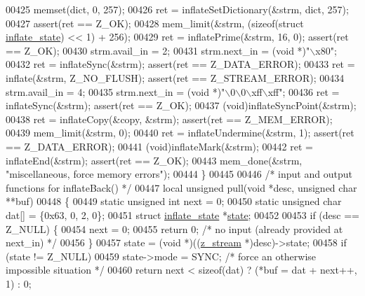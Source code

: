 \begin{DoxyCode}
{{{{{00425     memset(dict, 0, 257);
00426     ret = inflateSetDictionary(&strm, dict, 257);
00427                                                 assert(ret == Z\_OK);
00428     mem\_limit(&strm, (\textcolor{keyword}{sizeof}(\textcolor{keyword}{struct} \hyperlink{structinflate__state}{inflate\_state}) << 1) + 256);
00429     ret = inflatePrime(&strm, 16, 0);           assert(ret == Z\_OK);
00430     strm.avail\_in = 2;
00431     strm.next\_in = (\textcolor{keywordtype}{void} *)\textcolor{stringliteral}{"\(\backslash\)x80"};
00432     ret = inflateSync(&strm);                   assert(ret == Z\_DATA\_ERROR);
00433     ret = inflate(&strm, Z\_NO\_FLUSH);           assert(ret == Z\_STREAM\_ERROR);
00434     strm.avail\_in = 4;
00435     strm.next\_in = (\textcolor{keywordtype}{void} *)\textcolor{stringliteral}{"\(\backslash\)0\(\backslash\)0\(\backslash\)xff\(\backslash\)xff"};
00436     ret = inflateSync(&strm);                   assert(ret == Z\_OK);
00437     (void)inflateSyncPoint(&strm);
00438     ret = inflateCopy(&copy, &strm);            assert(ret == Z\_MEM\_ERROR);
00439     mem\_limit(&strm, 0);
00440     ret = inflateUndermine(&strm, 1);           assert(ret == Z\_DATA\_ERROR);
00441     (void)inflateMark(&strm);
00442     ret = inflateEnd(&strm);                    assert(ret == Z\_OK);
00443     mem\_done(&strm, \textcolor{stringliteral}{"miscellaneous, force memory errors"});
00444 \}
00445 
00446 \textcolor{comment}{/* input and output functions for inflateBack() */}
00447 local \textcolor{keywordtype}{unsigned} pull(\textcolor{keywordtype}{void} *desc, \textcolor{keywordtype}{unsigned} \textcolor{keywordtype}{char} **buf)
00448 \{
00449     \textcolor{keyword}{static} \textcolor{keywordtype}{unsigned} \textcolor{keywordtype}{int} next = 0;
00450     \textcolor{keyword}{static} \textcolor{keywordtype}{unsigned} \textcolor{keywordtype}{char} dat[] = \{0x63, 0, 2, 0\};
00451     \textcolor{keyword}{struct }\hyperlink{structinflate__state}{inflate\_state} *\hyperlink{structstate}{state};
00452 
00453     \textcolor{keywordflow}{if} (desc == Z\_NULL) \{
00454         next = 0;
00455         \textcolor{keywordflow}{return} 0;   \textcolor{comment}{/* no input (already provided at next\_in) */}
00456     \}
00457     state = (\textcolor{keywordtype}{void} *)((\hyperlink{structz__stream__s}{z\_stream} *)desc)->state;
00458     \textcolor{keywordflow}{if} (state != Z\_NULL)
00459         state->mode = SYNC;     \textcolor{comment}{/* force an otherwise impossible situation */}
00460     \textcolor{keywordflow}{return} next < \textcolor{keyword}{sizeof}(dat) ? (*buf = dat + next++, 1) : 0;
}}}}}
\end{DoxyCode}
